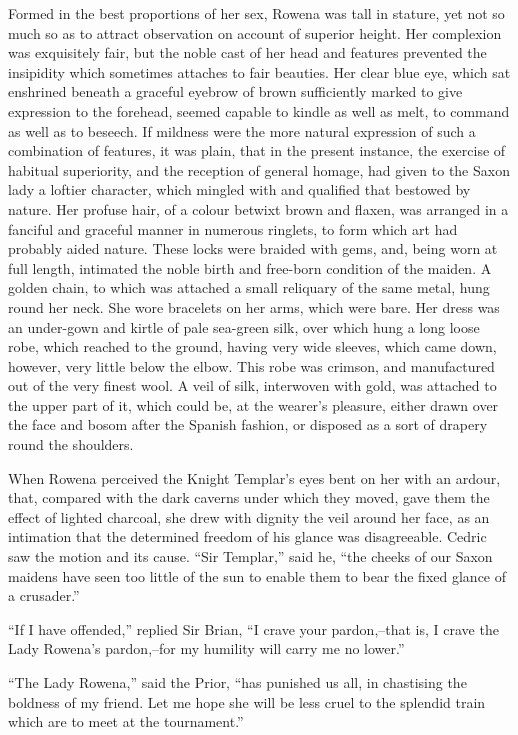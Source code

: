 Formed in the best proportions of her sex, Rowena was tall in stature,
yet not so much so as to attract observation on account of superior
height. Her complexion was exquisitely fair, but the noble cast of her
head and features prevented the insipidity which sometimes attaches to
fair beauties. Her clear blue eye, which sat enshrined beneath a
graceful eyebrow of brown sufficiently marked to give expression to the
forehead, seemed capable to kindle as well as melt, to command as well
as to beseech. If mildness were the more natural expression of such a
combination of features, it was plain, that in the present instance, the
exercise of habitual superiority, and the reception of general homage,
had given to the Saxon lady a loftier character, which mingled with and
qualified that bestowed by nature. Her profuse hair, of a colour betwixt
brown and flaxen, was arranged in a fanciful and graceful manner in
numerous ringlets, to form which art had probably aided nature. These
locks were braided with gems, and, being worn at full length, intimated
the noble birth and free-born condition of the maiden. A golden chain,
to which was attached a small reliquary of the same metal, hung round
her neck. She wore bracelets on her arms, which were bare. Her dress was
an under-gown and kirtle of pale sea-green silk, over which hung a long
loose robe, which reached to the ground, having very wide sleeves, which
came down, however, very little below the elbow. This robe was crimson,
and manufactured out of the very finest wool. A veil of silk, interwoven
with gold, was attached to the upper part of it, which could be, at the
wearer's pleasure, either drawn over the face and bosom after the
Spanish fashion, or disposed as a sort of drapery round the shoulders.

When Rowena perceived the Knight Templar's eyes bent on her with an
ardour, that, compared with the dark caverns under which they moved,
gave them the effect of lighted charcoal, she drew with dignity the veil
around her face, as an intimation that the determined freedom of his
glance was disagreeable. Cedric saw the motion and its cause. ``Sir
Templar,'' said he, ``the cheeks of our Saxon maidens have seen too
little of the sun to enable them to bear the fixed glance of a
crusader.''

``If I have offended,'' replied Sir Brian, ``I crave your pardon,--that
is, I crave the Lady Rowena's pardon,--for my humility will carry me no
lower.''

``The Lady Rowena,'' said the Prior, ``has punished us all, in
chastising the boldness of my friend. Let me hope she will be less cruel
to the splendid train which are to meet at the tournament.''

